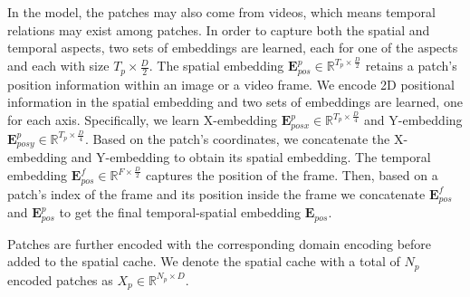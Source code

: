 \documentclass{article}
\begin{document}
In the model, the patches may also come from videos, which means temporal relations may exist among patches. In order to capture both the spatial and temporal aspects, two sets of embeddings are learned, each for one of the aspects and each with size $T_p \times \frac{D}{2}$. The spatial embedding $\mathbf{E}^{p}_{pos} \in \mathbb{R}^{T_p \times \frac{D}{2}}$ retains a patch's position information within an image or a video frame. We encode 2D positional information in the spatial embedding and two sets of embeddings are learned, one for each axis. Specifically, we learn X-embedding $\mathbf{E}^{p}_{posx} \in \mathbb{R}^{T_p \times \frac{D}{4}}$ and Y-embedding $\mathbf{E}^{p}_{posy} \in \mathbb{R}^{T_p \times \frac{D}{4}}$. Based on the patch's coordinates, we concatenate the X-embedding and Y-embedding to obtain its spatial embedding. The temporal embedding $\mathbf{E}^{f}_{pos} \in \mathbb{R}^{F \times \frac{D}{2}}$ captures the position of the frame. Then, based on a patch's index of the frame and its position inside the frame we concatenate $\mathbf{E}^{f}_{pos}$ and $\mathbf{E}^{p}_{pos}$ to get the final temporal-spatial embedding $\mathbf{E}_{pos}$. 

Patches are further encoded with the corresponding domain encoding before added to the spatial cache.  We denote the spatial cache with a total of $N_p$ encoded patches as $X_{p} \in \mathbb{R}^{N_p \times D}$.


\end{document}
